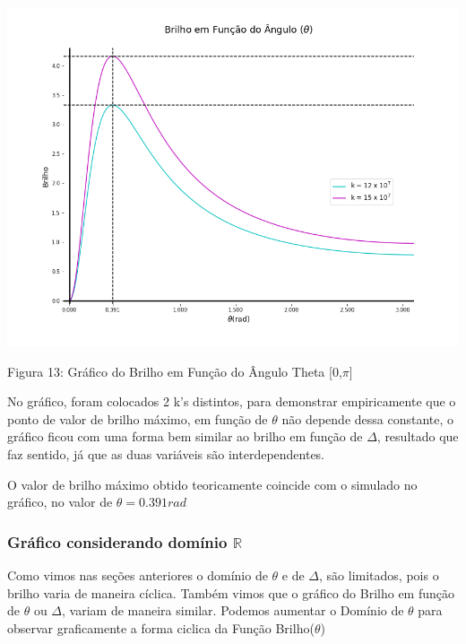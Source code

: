 \documentclass[a4paper, 12pt]{article}
\begin{document}
\begin{center}
    \includegraphics[width=16cm]{13-Brilho_Theta.png}
    
    Figura 13: Gráfico do Brilho em Função do Ângulo Theta [0,$\pi$]
    
\end{center}

No gráfico, foram colocados 2 k's distintos, para demonstrar empiricamente que o ponto de valor de brilho máximo, em função de $\theta$ não depende dessa constante, o gráfico ficou com uma forma bem similar ao brilho em função de $\Delta$, resultado que faz sentido, já que as duas variáveis são interdependentes.

O valor de brilho máximo obtido teoricamente coincide com o simulado no gráfico, no valor de $\theta = 0.391 rad$

\subsubsection{Gráfico considerando domínio $\mathbb{R}$}

Como vimos nas seções anteriores o domínio de $\theta$ e de $\Delta$, são limitados, pois o brilho varia de maneira cíclica. Também vimos que o gráfico do Brilho em função de $\theta$ ou $\Delta$, variam de maneira similar. 
Podemos aumentar o Domínio de $\theta$ para observar graficamente a forma ciclica da Função Brilho($\theta$)
\end{document}

